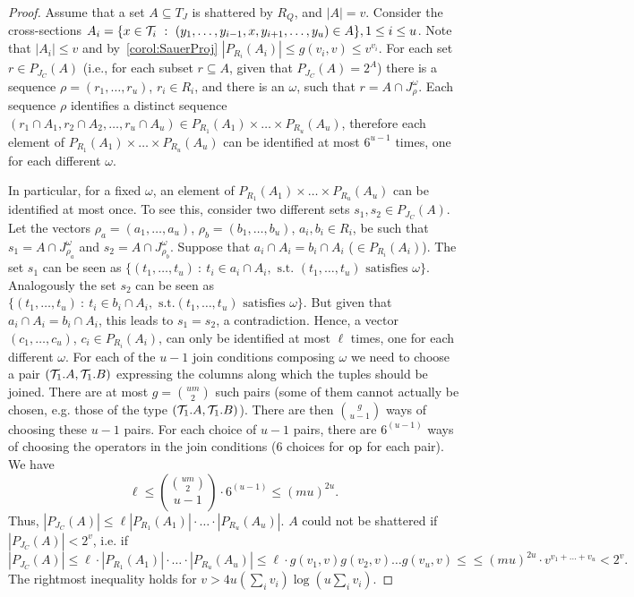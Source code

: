 \begin{proof}
Assume that a set $A\subseteq T_J$ is shattered by $R_Q$, and $|A|=v$. Consider
the cross-sections $A_i=\{x\in{\cal T}_i ~:~
(y_1,\dots,y_{i-1},x,y_{i+1},\dots,y_u)\in A\}, 1\le i\le u$.  Note that
$|A_i|\leq v$ and by~\ref{corol:SauerProj} $|P_{R_i} (A_i)|\leq g(v_i,v)
 \le v^{v_i}$. For each set $r \in P_{J_C}(A)$
(i.e., for each subset $r\subseteq A$, given that $P_{J_C}(A)=2^A$)  there is a
sequence $\rho=(r_1,\dots,r_u)$, $r_i\in R_i$, and there is an $\omega$, such
that $r = A \cap J^{\omega}_{\rho}$. Each sequence $\rho$ identifies a distinct
sequence $(r_1\cap A_1, r_2\cap A_2, \dots, r_u\cap A_u) \in
P_{R_1}(A_1)\times\dots\times P_{R_u}(A_u)$, therefore each element of
$P_{R_1}(A_1)\times \dots\times P_{R_u}(A_u)$ can be identified at most
$6^{u-1}$ times, one for each different $\omega$.

In particular, for a fixed $\omega$, an element of $P_{R_1}(A_1)\times
\dots\times P_{R_u}(A_u)$ can be identified at most once.
To see this, consider two different sets $s_1, s_2 \in
P_{J_C}(A)$. Let the vectors $\rho_a=(a_1,\dots,a_u)$,
$\rho_b=(b_1,\dots,b_u)$, $a_i,b_i\in R_i$, be such that $s_1 = A \cap
J^{\omega}_{\rho_a}$ and $s_2 = A \cap
J^{\omega}_{\rho_b}$. Suppose that $a_i\cap A_i = b_i\cap A_i$  ($\in
P_{R_i}(A_i)$). The set $s_1$ can be seen as $\{(t_1,\dots,t_u) ~:~ t_i\in a_i\cap
A_i,\mbox{ s.t. } (t_1,\dots,t_u) \mbox{ satisfies } \omega\}$. Analogously the
set $s_2$ can be seen as $\{(t_1,\dots, t_u) ~:~ t_i\in b_i\cap A_i, \mbox{ s.t.
} (t_1,\dots,t_u) \mbox{ satisfies } \omega\}$. But given that $a_i\cap A_i =
b_i\cap A_i$, this leads to $s_1=s_2$, a contradiction. Hence, a vector 
$(c_1,\dots,c_u)$, $c_i\in P_{R_i}(A_i)$, can only be identified at most $\ell$
times, one for each different $\omega$. For each of the $u-1$ join conditions
composing $\omega$ we need to choose a pair $({\cal T}_1.A,{\cal T}_1.B)$ expressing the
columns along which the tuples should be joined. There are at most $g=\binom{um}{2}$
such pairs (some of them cannot actually be chosen, e.g. those of the type
$({\cal T}_1.A, {\cal T}_1.B)$). There are then $\binom{g}{u-1}$ ways of choosing these
$u-1$ pairs. For each choice of $u-1$ pairs, there are $6^{(u-1)}$ ways of
choosing the operators in the join conditions ($6$ choices for $\operatorname{op}$ for each
pair). We have
\[
\ell\le \binom{\binom{um}{2}}{u-1}\cdot6^{(u-1)}\le (mu)^{2u}.
\]
Thus, $|P_{J_C} (A)|\leq \ell|P_{R_1} (A_1)|\cdot \dots \cdot|P_{R_u} (A_u)|$.
$A$ could not be shattered if $|P_{J_C}(A)|< 2^v$, i.e. if
\[
|P_{J_C} (A)| \leq \ell\cdot|P_{R_1} (A_1)|\cdot \dots\cdot |P_{R_u} (A_u)|\leq
\ell\cdot g(v_1,v)g(v_2,v)\dots g(v_u,v) \leq \leq (mu)^{2u} \cdot
v^{v_1+\dots+v_u}< 2^v.
\]
The rightmost inequality holds for $v> 4u\left(\sum_i v_i\right)\log (u\sum_i v_i)$.
\end{proof}

